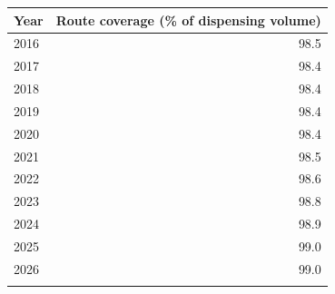 \begin{tabular}{@{}lr@{}}
\toprule
Year & Route coverage (\% of dispensing volume) \\
\midrule
2016 & 98.5 \\
2017 & 98.4 \\
2018 & 98.4 \\
2019 & 98.4 \\
2020 & 98.4 \\
2021 & 98.5 \\
2022 & 98.6 \\
2023 & 98.8 \\
2024 & 98.9 \\
2025 & 99.0 \\
2026 & 99.0 \\
\botrule
\end{tabular}
